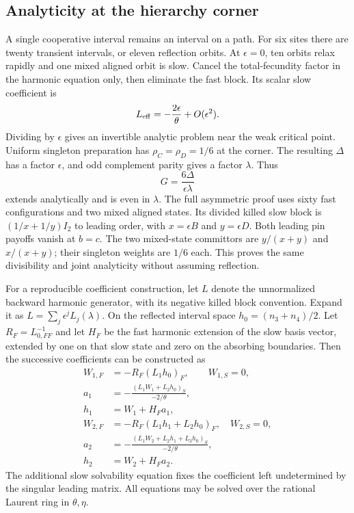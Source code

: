 \documentclass[aps,pre,reprint,amsmath,amssymb,longbibliography]{revtex4-2}
\begin{document}
\subsection{Analyticity at the hierarchy corner}
\label{par:v3-joint-selected-analyticity}
A single cooperative interval remains an interval on a path.
For six sites there are twenty transient intervals, or eleven
reflection orbits. At $\epsilon=0$, ten orbits relax rapidly and
one mixed aligned orbit is slow. Cancel the total-fecundity factor
in the harmonic equation only, then eliminate the fast block.
Its scalar slow coefficient is
\begin{equation}
 L_{\rm eff}=-\frac{2\epsilon}{\theta}+O(\epsilon^2).
 \label{eq:v3-joint-slow-divisor}
\end{equation}
Dividing by $\epsilon$ gives an invertible analytic problem near the
weak critical point. Uniform singleton preparation has
$\rho_C=\rho_D=1/6$ at the corner. The resulting $\Delta$ has a
factor $\epsilon$, and odd complement parity gives a factor $\lambda$.
Thus
\begin{equation}
 G=\frac{6\Delta}{\epsilon\lambda}
 \label{eq:v3-joint-normalized-signal}
\end{equation}
extends analytically and is even in $\lambda$. The full asymmetric
proof uses sixty fast configurations and two mixed aligned states.
Its divided killed slow block is
$(1/x+1/y)I_2$ to leading order, with $x=\epsilon B$ and
$y=\epsilon D$. Both leading pin payoffs vanish at $b=c$.
The two mixed-state committors are $y/(x+y)$ and $x/(x+y)$;
their singleton weights are $1/6$ each. This proves the same
divisibility and joint analyticity without assuming reflection.

For a reproducible coefficient construction, let $L$ denote the
unnormalized backward harmonic generator, with its negative killed
block convention. Expand it as $L=\sum_j\epsilon^jL_j(\lambda)$. On the reflected interval
space $h_0=(n_3+n_4)/2$. Let $R_F=L_{0,FF}^{-1}$ and let $H_F$
be the fast harmonic extension of the slow basis vector, extended
by one on that slow state and zero on the absorbing boundaries.
Then the successive coefficients can be constructed as
\begin{equation}
 \begin{aligned}
 W_{1,F}&=-R_F(L_1h_0)_F,\qquad W_{1,S}=0,\\
 a_1&=-\frac{(L_1W_1+L_2h_0)_S}{-2/\theta},\\
 h_1&=W_1+H_Fa_1,\\
 W_{2,F}&=-R_F(L_1h_1+L_2h_0)_F,\quad W_{2,S}=0,\\
 a_2&=-\frac{(L_1W_2+L_2h_1+L_3h_0)_S}{-2/\theta},\\
 h_2&=W_2+H_Fa_2.
 \end{aligned}
 \label{eq:v3-joint-selected-recursion}
\end{equation}
The additional slow solvability equation fixes the coefficient left
undetermined by the singular leading matrix. All equations may be solved over the rational Laurent ring in
$\theta,\eta$.
\end{document}
